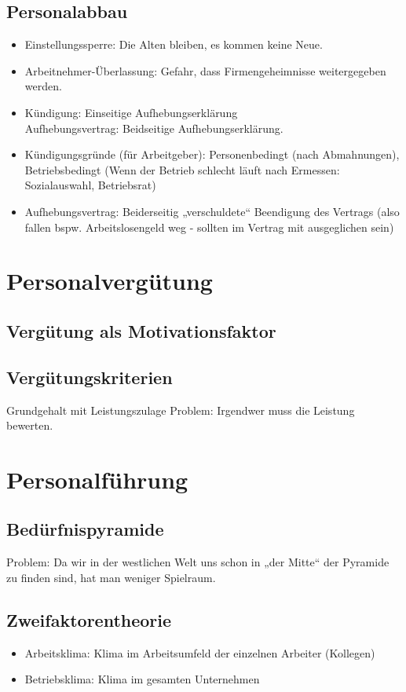 \documentclass{scrreprt}
\begin{document}
\subsection{Personalabbau}
\begin{itemize}
\item Einstellungssperre: Die Alten bleiben, es kommen keine Neue.
\item Arbeitnehmer-Überlassung: Gefahr, dass Firmengeheimnisse weitergegeben werden.
\item Kündigung: Einseitige Aufhebungserklärung\\
Aufhebungsvertrag: Beidseitige Aufhebungserklärung.
\item Kündigungsgründe (für Arbeitgeber): Personenbedingt (nach Abmahnungen), Betriebsbedingt (Wenn der Betrieb schlecht läuft nach Ermessen: Sozialauswahl, Betriebsrat)
\item Aufhebungsvertrag: Beiderseitig „verschuldete“ Beendigung des Vertrags (also fallen bspw. Arbeitslosengeld weg - sollten im Vertrag mit ausgeglichen sein)
\end{itemize}
\section{Personalvergütung}
\subsection{Vergütung als Motivationsfaktor}
\subsection{Vergütungskriterien}
Grundgehalt mit Leistungszulage Problem: Irgendwer muss die Leistung bewerten.
\section{Personalführung}
\subsection{Bedürfnispyramide}
Problem: Da wir in der westlichen Welt uns schon in „der Mitte“ der Pyramide zu finden sind, hat man weniger Spielraum.
\subsection{Zweifaktorentheorie}
\begin{itemize}
\item Arbeitsklima: Klima im Arbeitsumfeld der einzelnen Arbeiter (Kollegen)
\item Betriebsklima: Klima im gesamten Unternehmen
\end{itemize}
\end{document}
